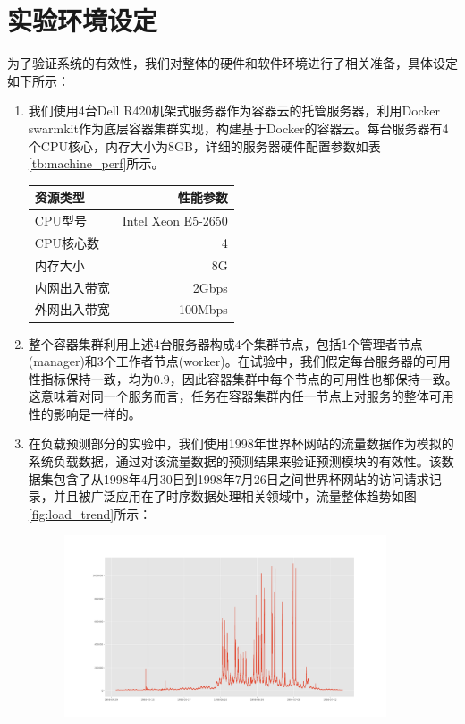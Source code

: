 \section{实验环境设定}\label{sec:env_prep}
为了验证系统的有效性，我们对整体的硬件和软件环境进行了相关准备，具体设定如下所示：
\begin{enumerate}
\item 我们使用4台Dell R420机架式服务器作为容器云的托管服务器，利用Docker swarmkit作为底层容器集群实现，构建基于Docker的容器云。每台服务器有4个CPU核心，内存大小为8GB，详细的服务器硬件配置参数如表\ref{tb:machine_perf}所示。
\begin{table}[h]
\centering
{}
\begin{tabular}{@{}lr@{}} \toprule
 资源类型 & 性能参数 \\ \midrule
 CPU型号 & Intel Xeon E5-2650\\
 CPU核心数 & 4\\
 内存大小 & 8G\\
 内网出入带宽 & 2Gbps\\
 外网出入带宽 & 100Mbps\\ \bottomrule
\end{tabular}
\end{table}
\item 整个容器集群利用上述4台服务器构成4个集群节点，包括1个管理者节点(manager)和3个工作者节点(worker)。在试验中，我们假定每台服务器的可用性指标保持一致，均为0.9，因此容器集群中每个节点的可用性也都保持一致。这意味着对同一个服务而言，任务在容器集群内任一节点上对服务的整体可用性的影响是一样的。
\item 在负载预测部分的实验中，我们使用1998年世界杯网站的流量数据作为模拟的系统负载数据，通过对该流量数据的预测结果来验证预测模块的有效性。该数据集包含了从1998年4月30日到1998年7月26日之间世界杯网站的访问请求记录，并且被广泛应用在了时序数据处理相关领域中，流量整体趋势如图\ref{fig:load_trend}所示：
\begin{figure}[htbp]
\centering
\includegraphics[width=0.9\textwidth]{./figure/alldata}

\end{figure}
\end{enumerate}
